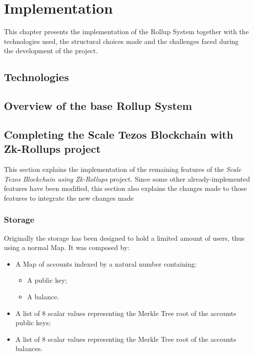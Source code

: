 \chapter{Implementation\label{cha:chapter5}}

This chapter presents the implementation of the Rollup System together with the technologies used, the structural choices made and the challenges faced during the development of the project.

\section{Technologies\label{sec:technologies}}

\section{Overview of the base Rollup System}


\section{Completing the Scale Tezos Blockchain with Zk-Rollups project}
This section explains the implementation of the remaining features of the \textit{Scale Tezos Blockchain using Zk-Rollups} project. Since some other already-implemented features have been modified, this section also explains the changes made to those features to integrate the new changes made

\subsection{Storage}

Originally the storage has been designed to hold a limited amount of users, thus using a normal Map. It was composed by:
\begin{itemize}
	\item A Map of accounts indexed by a natural number containing:
		\begin{itemize}
			\item A public key;
			\item A balance.
		\end{itemize}
	\item A list of 8 scalar values representing the Merkle Tree root of the accounts public keys;
	\item A list of 8 scalar values representing the Merkle Tree root of the accounts balances.
\end{itemize}

